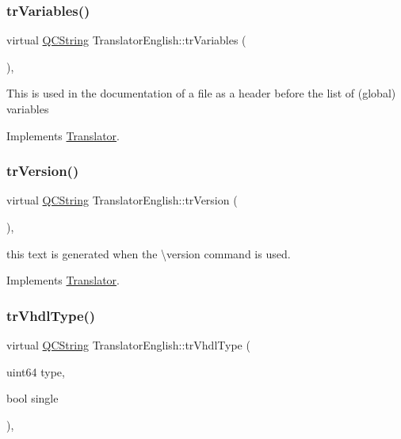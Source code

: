\mbox{\label{class_translator_english_ab26b550e1bc2094d9735ca22ae0119f9}} 
\subsubsection{\texorpdfstring{trVariables()}{trVariables()}}
{\footnotesize\ttfamily virtual \mbox{\hyperlink{class_q_c_string}{Q\+C\+String}} Translator\+English\+::tr\+Variables (\begin{DoxyParamCaption}{ }\end{DoxyParamCaption})\hspace{0.3cm}{\ttfamily [inline]}, {\ttfamily [virtual]}}

This is used in the documentation of a file as a header before the list of (global) variables 

Implements \mbox{\hyperlink{class_translator}{Translator}}.

\mbox{\label{class_translator_english_a72ca33e8bb9f9187cc005809b09d93ff}} 
\subsubsection{\texorpdfstring{trVersion()}{trVersion()}}
{\footnotesize\ttfamily virtual \mbox{\hyperlink{class_q_c_string}{Q\+C\+String}} Translator\+English\+::tr\+Version (\begin{DoxyParamCaption}{ }\end{DoxyParamCaption})\hspace{0.3cm}{\ttfamily [inline]}, {\ttfamily [virtual]}}

this text is generated when the \textbackslash{}version command is used. 

Implements \mbox{\hyperlink{class_translator}{Translator}}.

\mbox{\label{class_translator_english_af28efb9b5cc093f3c9fc3b03390a9611}} 
\subsubsection{\texorpdfstring{trVhdlType()}{trVhdlType()}}
{\footnotesize\ttfamily virtual \mbox{\hyperlink{class_q_c_string}{Q\+C\+String}} Translator\+English\+::tr\+Vhdl\+Type (\begin{DoxyParamCaption}\item[{uint64}]{type,  }\item[{bool}]{single }\end{DoxyParamCaption})\hspace{0.3cm}{\ttfamily [inline]}, {\ttfamily [virtual]}}

